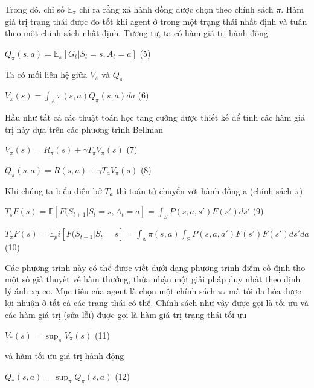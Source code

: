 \documentclass[14pt]{extreport}
\begin{document}
 Trong đó, chỉ số $\mathbb{E}_ \pi$ chỉ ra rằng xá hành đồng được chọn theo chính sách $\pi$. Hàm giá trị trạng thái được đo tốt khi agent ở trong một trạng thái nhất định và tuân theo một chính sách nhất định. Tương tự, ta có hàm giá trị hành động
 
 \begin{center}
 $Q_ \pi (s,a)= \mathbb{E}_ \pi [G_t|S_t=s,A_t=a]$      (5)
 \end{center}
 
 Ta có mối liên hệ giữa $V_ \pi$ và $Q_ \pi$
 
 \begin{center}
 $V_ \pi (s)= \int _{A} \pi (s,a) Q_ \pi (s,a) da$      (6)
 \end{center}
 
 Hầu như tất cả các thuật toán học tăng cường được thiết kế để tính các hàm giá trị này dựa trên các phương trình Bellman
 
 \begin{center}
 $V_ {\pi} (s)=R_{\pi} (s)+ \gamma T_{\pi}V_{\pi}(s)    $     (7)
 
 $Q_{\pi}(s,a) = R(s,a)+ \gamma T_a V_ {\pi}(s) $        (8)
 \end{center}
 
 Khi chúng ta biểu diễn bở $T_a$ thì toán tử chuyển với hành đồng a (chính sách $\pi$)
 
 \begin{center}
 $T_s F(s)=\mathbb{E}[F(S_{t+1} |S_t = s,A_t =a]= \int _{S} P(s,a,s') F(s') ds'$  (9)
 
 $T_ \pi F(s)= \mathbb{E}_ pi [F(S_{t+1} |S_t = s]= \int _{\mathbb{A} } \pi (s,a) \int _{\mathbb{S}} P(s,a,a') F(s') F(s') ds' da$  (10)
 \end{center}
 
 Các phương trình này có thể được viết dưới dạng phương trình điểm cố định tho một số giả thuyết về hàm thưởng, thừa nhận một giải pháp duy nhất theo định lý ánh xạ co. Mục tiêu của agent là chọn một chính sách $\pi_{*}$ mà tối đa hóa được lợi nhuận ở tất cả các trạng thái có thể. Chính sách như vậy được gọi là tối ưu và các hàm giá trị (sửa lỗi) được gọi là hàm giá trị trạng thái tối ưu
 
 \begin{center}
 $V_{*} (s)= \sup_{\pi} V_\pi (s)$  (11)
 \end{center}
 
 và hàm tối ưu giá trị-hành động
 
 \begin{center}
 $Q_{*}(s,a)= \sup _\pi Q_\pi (s,a)$ (12)
 \end{center}
 
\end{document}
